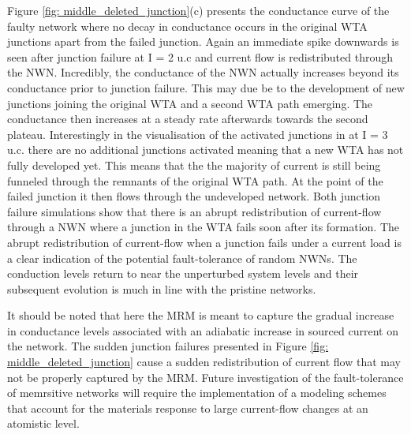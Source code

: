 Figure \ref{fig: middle_deleted_junction}(c) presents the conductance curve of the faulty network where no decay in conductance occurs in the original WTA junctions apart from the failed junction. Again an immediate spike downwards is seen after junction failure at I = 2 u.c and current flow is redistributed through the NWN. Incredibly, the conductance of the NWN actually increases beyond its conductance prior to junction failure. This may due be to the development of new junctions joining the original WTA and a second WTA path emerging. The conductance then increases at a steady rate afterwards towards the second plateau. Interestingly in the visualisation of the activated junctions in at I = 3 u.c. there are no additional junctions activated meaning that a new WTA has not fully developed yet. This means that the the majority of current is still being funneled through the remnants of the original WTA path. At the point of the failed junction it then flows through the undeveloped network. Both junction failure simulations show that there is an abrupt redistribution of current-flow through a NWN where a junction in the WTA fails soon after its formation. The abrupt redistribution of current-flow when a junction fails under a current load is a clear indication of the potential fault-tolerance of random NWNs. The conduction levels return to near the unperturbed system levels and their subsequent evolution is much in line with the pristine networks. 

It should be noted that here the MRM is meant to capture the gradual increase in conductance levels associated with an adiabatic increase in sourced current on the network. The sudden junction failures presented in Figure \ref{fig: middle_deleted_junction} cause a sudden redistribution of current flow that may not be properly captured by the MRM. Future investigation of the fault-tolerance of memrsitive networks will require the implementation of a modeling schemes that account for the materials response to large current-flow changes at an atomistic level\cite{hansen2015,menzel2015,menzel2017}.

